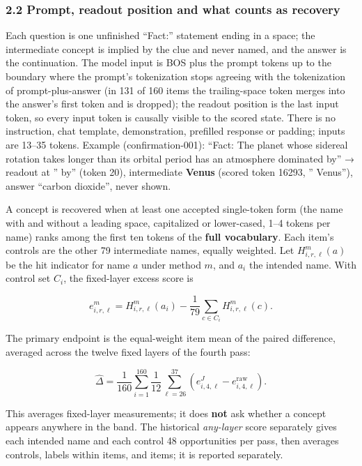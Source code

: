 \documentclass[
  british,
  11pt,
  a4paper,
]{article}
\begin{document}
\subsubsection{2.2 Prompt, readout position and what counts as
recovery}\label{prompt-readout-position-and-what-counts-as-recovery}

Each question is one unfinished ``Fact:'' statement ending in a space;
the intermediate concept is implied by the clue and never named, and the
answer is the continuation. The model input is BOS plus the prompt
tokens up to the boundary where the prompt's tokenization stops agreeing
with the tokenization of prompt-plus-answer (in 131 of 160 items the
trailing-space token merges into the answer's first token and is
dropped); the readout position is the last input token, so every input
token is causally visible to the scored state. There is no instruction,
chat template, demonstration, prefilled response or padding; inputs are
13--35 tokens. Example (confirmation-001): ``Fact: The planet whose
sidereal rotation takes longer than its orbital period has an atmosphere
dominated by'' → readout at '' by'' (token 20), intermediate
\textbf{Venus} (scored token 16293, '' Venus''), answer ``carbon
dioxide'', never shown.

A concept is recovered when at least one accepted single-token form (the
name with and without a leading space, capitalized or lower-cased, 1--4
tokens per name) ranks among the first ten tokens of the \textbf{full
vocabulary}. Each item's controls are the other 79 intermediate names,
equally weighted. Let \(H_{i,r,\ell}^{m}(a)\) be the hit indicator for
name \(a\) under method \(m\), and \(a_i\) the intended name. With
control set \(C_i\), the fixed-layer excess score is

\[
e_{i,r,\ell}^{m}=H_{i,r,\ell}^{m}(a_i)
-\frac{1}{79}\sum_{c\in C_i}H_{i,r,\ell}^{m}(c).
\]

The primary endpoint is the equal-weight item mean of the paired
difference, averaged across the twelve fixed layers of the fourth pass:

\[
\widehat{\Delta}
=\frac{1}{160}\sum_{i=1}^{160}\frac{1}{12}
\sum_{\ell=26}^{37}\left(e_{i,4,\ell}^{J}-e_{i,4,\ell}^{\mathrm{raw}}\right).
\]

This averages fixed-layer measurements; it does \textbf{not} ask whether
a concept appears anywhere in the band. The historical \emph{any-layer}
score separately gives each intended name and each control 48
opportunities per pass, then averages controls, labels within items, and
items; it is reported separately.
\end{document}
